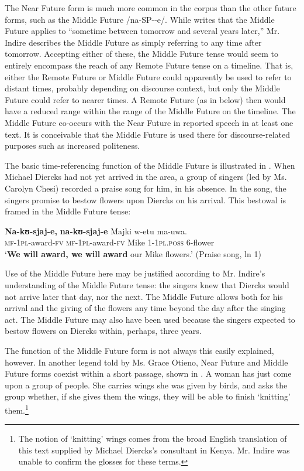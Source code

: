 \documentclass[output=paper]{langsci/langscibook}
\begin{document}
The Near Future form is much more common in the corpus than the other future forms, such as the Middle Future /na-SP-{\longrule}-e/. While \citet[285]{Leung1991} writes that the Middle Future applies to “sometime between tomorrow and several years later,” Mr. Indire describes the Middle Future as simply referring to any time after tomorrow. Accepting either of these, the Middle Future tense would seem to entirely encompass the reach of any Remote Future tense on a timeline. That is, either the Remote Future or Middle Future could apparently be used to refer to distant times, probably depending on discourse context, but only the Middle Future could refer to nearer times. A Remote Future (as in  below) then would have a reduced range within the range of the Middle Future on the timeline. %
%
The Middle Future co-occurs with the Near Future in reported speech in at least one text. It is conceivable that the Middle Future is used there for discourse-related purposes such as increased politeness. 

The basic time-referencing function of the Middle Future is illustrated in . When Michael Diercks had not yet arrived in the  area, a group of singers (led by Ms. Carolyn Chesi) recorded a praise song for him, in his absence. In the song, the singers promise to bestow flowers upon Diercks on his arrival. This bestowal is framed in the Middle Future tense:

\ea\label{ex:sarvasy:12}
\gll \textbf{Na-kʊ-sjaj-e,}    \textbf{na-kʊ-sjaj-e}    Majki  w-etu    ma-uwa. \\
\textsc{mf-1pl}-award-\textsc{fv}  \textsc{mf-1pl-}award-\textsc{fv}  Mike  1-\textsc{1pl.poss}  6-flower \\
\glt ‘\textbf{We will award, we will award} our Mike flowers.’ (Praise song, ln 1)
\z

Use of the Middle Future here may be justified according to Mr. Indire’s understanding of the Middle Future tense: the singers knew that Diercks would not arrive later that day, nor the next. The Middle Future allows both for his arrival and the giving of the flowers any time beyond the day after the singing act. The Middle Future may also have been used because the singers expected to bestow flowers on Diercks within, perhaps, three years. 

The function of the Middle Future form is not always this easily explained, however. In another legend told by Ms. Grace Otieno, Near Future and Middle Future forms coexist within a short passage, shown in . A woman has just come upon a group of people. She carries wings she was given by birds, and asks the group whether, if she gives them the wings, they will be able to finish ‘knitting’ them.\footnote{The notion of ‘knitting’ wings comes from the broad English translation of this text supplied by Michael Diercks’s  consultant in Kenya. Mr. Indire was unable to confirm the glosses for these terms.}
\end{document}
